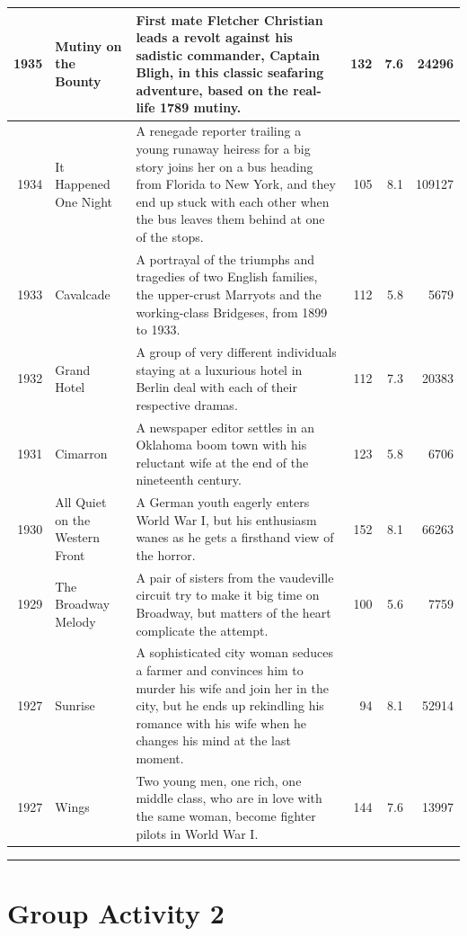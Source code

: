 \documentclass[
]{book}
\begin{document}
\begin{tabular}{r|l|l|r|r|r}
\hline
1935 & Mutiny on the Bounty & First mate Fletcher Christian leads a revolt against his sadistic commander, Captain Bligh, in this classic seafaring adventure, based on the real-life 1789 mutiny. & 132 & 7.6 & 24296\\
\hline
1934 & It Happened One Night & A renegade reporter trailing a young runaway heiress for a big story joins her on a bus heading from Florida to New York, and they end up stuck with each other when the bus leaves them behind at one of the stops. & 105 & 8.1 & 109127\\
\hline
1933 & Cavalcade & A portrayal of the triumphs and tragedies of two English families, the upper-crust Marryots and the working-class Bridgeses, from 1899 to 1933. & 112 & 5.8 & 5679\\
\hline
1932 & Grand Hotel & A group of very different individuals staying at a luxurious hotel in Berlin deal with each of their respective dramas. & 112 & 7.3 & 20383\\
\hline
1931 & Cimarron & A newspaper editor settles in an Oklahoma boom town with his reluctant wife at the end of the nineteenth century. & 123 & 5.8 & 6706\\
\hline
1930 & All Quiet on the Western Front & A German youth eagerly enters World War I, but his enthusiasm wanes as he gets a firsthand view of the horror. & 152 & 8.1 & 66263\\
\hline
1929 & The Broadway Melody & A pair of sisters from the vaudeville circuit try to make it big time on Broadway, but matters of the heart complicate the attempt. & 100 & 5.6 & 7759\\
\hline
1927 & Sunrise & A sophisticated city woman seduces a farmer and convinces him to murder his wife and join her in the city, but he ends up rekindling his romance with his wife when he changes his mind at the last moment. & 94 & 8.1 & 52914\\
\hline
1927 & Wings & Two young men, one rich, one middle class, who are in love with the same woman, become fighter pilots in World War I. & 144 & 7.6 & 13997\\
\hline
\end{tabular}

\begin{center}\rule{0.5\linewidth}{0.5pt}\end{center}

\hypertarget{group-activity-2-3}{%
\section{Group Activity 2}\label{group-activity-2-3}}
\end{document}
